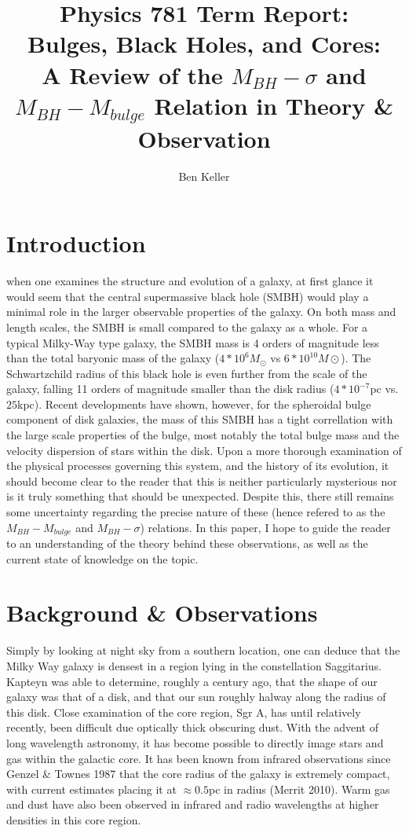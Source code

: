 \documentclass[12pt]{article}
\begin{document}
\title{Physics 781 Term Report:\\  Bulges, Black Holes, and Cores:\\ A Review of
the $M_{BH}-\sigma$ and  $M_{BH}-M_{bulge}$ Relation in Theory \& Observation}
\author{Ben Keller}
\maketitle
\newpage

\section{Introduction}
when one examines the structure and evolution of a galaxy, at first glance it 
would seem that the central supermassive black hole (SMBH) would play a 
minimal role in the larger observable properties of the galaxy.  On both mass 
and length scales, the SMBH is small compared to the galaxy as a whole.  For
a typical Milky-Way type galaxy, the SMBH mass is 4 orders of magnitude less 
than the total baryonic mass of the galaxy 
($4*10^6M_\odot$ vs $6*10^{10}M\odot$).  The Schwartzchild radius of this black
hole is even further from the scale of the galaxy, falling 11 orders of 
magnitude smaller than the disk radius ($4*10^{-7}$pc vs. $25$kpc).  Recent 
developments have shown, however, for the spheroidal bulge component of disk 
galaxies, the mass of this SMBH has a tight correllation with the large scale
properties of the bulge, most notably the total bulge mass and the velocity 
dispersion of stars within the disk.  Upon a more thorough examination of the
physical processes governing this system, and the history of its evolution, it
should become clear to the reader that this is neither particularly mysterious
nor is it truly something that should be unexpected.  Despite this, there still
remains some uncertainty regarding the precise nature of these (hence
refered to as the $M_{BH}-M_{bulge}$ and $M_{BH}-\sigma$) relations.  In this
paper, I hope to guide the reader to an understanding of the theory behind these
observations, as well as the current state of knowledge on the topic.
\section{Background \& Observations}
Simply by looking at night sky from a southern location, one can deduce that
the Milky Way galaxy is densest in a region lying in the constellation 
Saggitarius.  Kapteyn was able to determine, roughly a century ago, that the
shape of our galaxy was that of a disk, and that our sun roughly halway along
the radius of this disk.  Close examination of the core region, Sgr A, has 
until relatively recently, been difficult due optically thick obscuring dust.
With the advent of long wavelength astronomy, it has become possible to directly
image stars and gas within the galactic core.  It has been known from infrared
observations since Genzel \& Townes 1987 that the core radius of the galaxy is
extremely compact, with current estimates placing it at $\approx 0.5$pc in
radius (Merrit 2010).  Warm gas and dust have also been observed in infrared and
radio wavelengths at higher densities in this core region.
\end{document}
